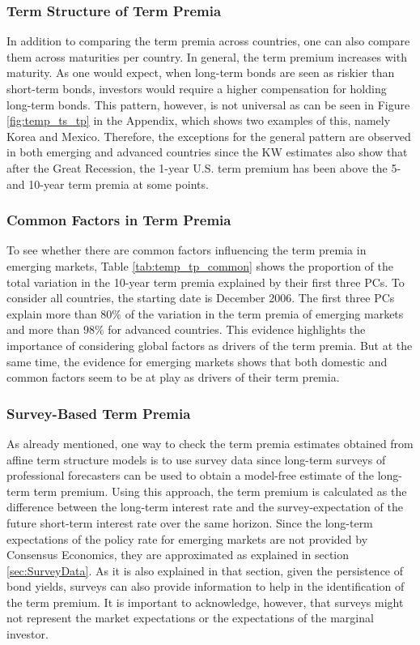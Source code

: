 {\subsubsection{Term Structure of Term Premia}
In addition to comparing the term premia across countries, one can also compare them across maturities per country. In general, the term premium increases with maturity. As one would expect, when long-term bonds are seen as riskier than short-term bonds, investors would require a higher compensation for holding long-term bonds. This pattern, however, is not universal as can be seen in Figure \ref{fig:temp_ts_tp} in the Appendix, which shows two examples of this, namely Korea and Mexico. Therefore, the exceptions for the general pattern are observed in both emerging and advanced countries since the KW estimates also show that after the Great Recession, the 1-year U.S. term premium has been above the 5- and 10-year term premia at some points.
%	

\subsubsection{Common Factors in Term Premia}
To see whether there are common factors influencing the term premia in emerging markets, Table \ref{tab:temp_tp_common} shows the proportion of the total variation in the 10-year term premia explained by their first three PCs. To consider all countries, the starting date is December 2006. The first three PCs explain more than $80\%$ of the variation in the term premia of emerging markets and more than $98\%$ for advanced countries. This evidence highlights the importance of considering global factors as drivers of the term premia. But at the same time, the evidence for emerging markets shows that both domestic and common factors seem to be at play as drivers of their term premia.
%	
%	
	

\subsubsection{Survey-Based Term Premia}
As already mentioned, one way to check the term premia estimates obtained from affine term structure models is to use survey data since long-term surveys of professional forecasters can be used to obtain a model-free estimate of the long-term term premium. Using this approach, the term premium is calculated as the difference between the long-term interest rate and the survey-expectation of the future short-term interest rate over the same horizon. Since the long-term expectations of the policy rate for emerging markets are not provided by Consensus Economics, they are approximated as explained in section \ref{sec:SurveyData}. As it is also explained in that section, given the persistence of bond yields, surveys can also provide information to help in the identification of the term premium.
 It is important to acknowledge, however, that surveys might not represent the market expectations or the expectations of the marginal investor.

}
